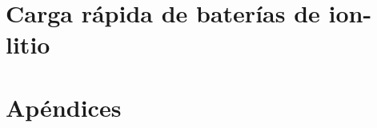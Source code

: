 \documentclass[12pt,spanish,a4paper,twoside]{book}
\begin{document}
\part{Carga rápida de baterías de ion-litio}







% 

% 

% 

% 

%
%
%

\part{Apéndices}

\appendix
\renewcommand\chaptername{Apéndice}




\end{document}
